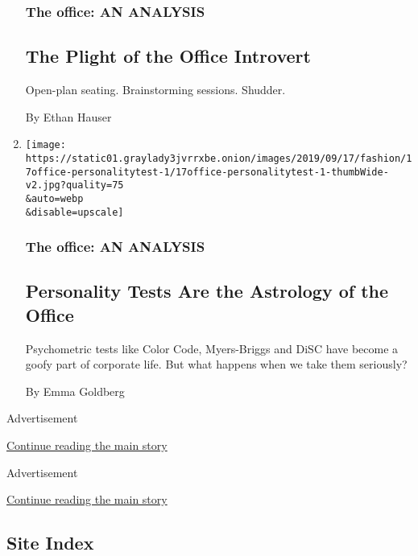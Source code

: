 \begin{enumerate}
  \hypertarget{the-office-an-analysis-6}{%
  \subsubsection{The office: AN
  ANALYSIS}\label{the-office-an-analysis-6}}

  \hypertarget{the-plight-of-the-office-introvert}{%
  \subsection{The Plight of the Office
  Introvert}\label{the-plight-of-the-office-introvert}}

  Open-plan seating. Brainstorming sessions. Shudder.

  By Ethan Hauser
\item
  \href{/2019/09/17/style/personality-tests-office.html}{}

  \texttt{[image: https://static01.graylady3jvrrxbe.onion/images/2019/09/17/fashion/17office-personalitytest-1/17office-personalitytest-1-thumbWide-v2.jpg?quality=75\\\&auto=webp\\\&disable=upscale]}

  \hypertarget{the-office-an-analysis-7}{%
  \subsubsection{The office: AN
  ANALYSIS}\label{the-office-an-analysis-7}}

  \hypertarget{personality-tests-are-the-astrology-of-the-office}{%
  \subsection{Personality Tests Are the Astrology of the
  Office}\label{personality-tests-are-the-astrology-of-the-office}}

  Psychometric tests like Color Code, Myers-Briggs and DiSC have become
  a goofy part of corporate life. But what happens when we take them
  seriously?

  By Emma Goldberg
\end{enumerate}

Advertisement

\protect\hyperlink{after-mid2}{Continue reading the main story}

Advertisement

\protect\hyperlink{after-mktg}{Continue reading the main story}

\hypertarget{site-index}{%
\subsection{Site Index}\label{site-index}}

